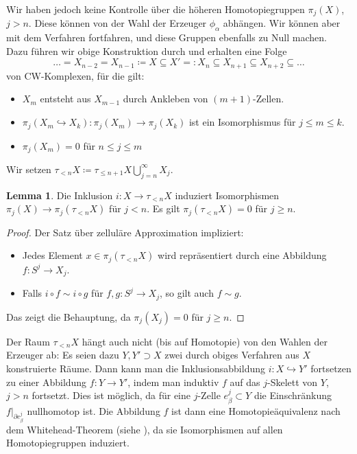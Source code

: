 \documentclass[11pt, a4paper, german]{article}
\theoremstyle{definition}
\newtheorem{lem}{Lemma}
\theoremstyle{remark}
\newcommand{\trunc}[2]{\tau_{#1} #2} %
\begin{document}
Wir haben jedoch keine Kontrolle über die höheren Homotopiegruppen $\pi_j(X)$, $j > n$.
Diese können von der Wahl der Erzeuger $\phi_\alpha$ abhängen.
Wir können aber mit dem Verfahren fortfahren, und diese Gruppen ebenfalls zu Null machen.
Dazu führen wir obige Konstruktion durch und erhalten eine Folge
\[ \ldots = X_{n-2} = X_{n-1} \coloneqq X \subseteq X' =: X_n \subseteq X_{n+1} \subseteq X_{n+2} \subseteq \ldots \]
von CW-Komplexen, für die gilt:
\begin{itemize}
  \item $X_m$ entsteht aus $X_{m-1}$ durch Ankleben von $(m{+}1)$-Zellen.
  \item $\pi_j(X_m \hookrightarrow X_k) : \pi_j(X_m) \to \pi_j(X_k)$ ist ein Isomorphismus für $j \leq m \leq k$.
  \item $\pi_j(X_m) = 0$ für $n \leq j \leq m$
\end{itemize}
Wir setzen $\trunc{< n}{X} \coloneqq \trunc{\leq n+1}{X} \bigcup_{j=n}^\infty X_j$.

\begin{lem}
  Die Inklusion $i : X \to \trunc{< n}{X}$ induziert Isomorphismen $\pi_j(X) \to \pi_j(\trunc{< n}{X})$ für $j < n$.
  Es gilt $\pi_j(\trunc{< n}{X}) = 0$ für $j \geq n$.
\end{lem}

\begin{proof}
  Der Satz über zelluläre Approximation impliziert:
  \begin{itemize}
    \item Jedes Element $x \in \pi_j(\trunc{< n}{X})$ wird repräsentiert durch eine Abbildung $f : S^j \to X_j$.
    \item Falls $i \circ f \sim i \circ g$ für $f, g : S^j \to X_j$, so gilt auch $f \sim g$.
  \end{itemize}
  Das zeigt die Behauptung, da $\pi_j(X_j) = 0$ für $j \geq n$.
\end{proof}

Der Raum $\trunc{< n}{X}$ hängt auch nicht (bis auf Homotopie) von den Wahlen der Erzeuger ab:
Es seien dazu $Y, Y' \supset X$ zwei durch obiges Verfahren aus $X$ konstruierte Räume.
Dann kann man die Inklusionsabbildung $i : X \hookrightarrow Y'$ fortsetzen zu einer Abbildung $f : Y \to Y'$, indem man induktiv $f$ auf das $j$-Skelett von $Y$, $j > n$ fortsetzt.
Dies ist möglich, da für eine $j$-Zelle $e_\beta^j \subset Y$ die Einschränkung $f|_{\partial e_\beta^j}$ nullhomotop ist.
Die Abbildung $f$ ist dann eine Homotopieäquivalenz nach dem Whitehead-Theorem (siehe \cite[Thm 4.5]{hatcher:at}), da sie Isomorphismen auf allen Homotopiegruppen induziert.
\end{document}
